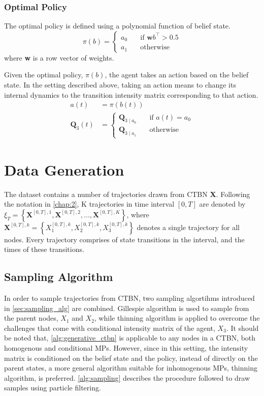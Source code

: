 \subsubsection{Optimal Policy}

The optimal policy is defined using a polynomial function of belief state.
\begin{equation}
\pi(b) = 
\begin{cases}
a_0 & \quad \text{if } \textbf{w}b^\intercal > 0.5 \\
a_1 & \quad \text{otherwise}
\end{cases}
\end{equation}
where \textbf{w} is a row vector of weights.

Given the optimal policy, $ \pi(b) $, the agent takes an action based on the belief state. In the setting described above, taking an action means to change its internal dynamics to the transition intensity matrix corresponding to that action.
\begin{align}
a(t) &= \pi(b(t))\\
\textbf{Q}_3(t) & = \begin{cases}
\textbf{Q}_{3\mid a_{0}} & \quad \text{if } a(t) = a_0 \\
\textbf{Q}_{3\mid a_{1}} & \quad \text{otherwise}
\end{cases}
\end{align}

\section{Data Generation}
The dataset contains a number of trajectories drawn from CTBN \textbf{X}. Following the notation in \cref{chap:2}, K trajectories in time interval $ [0, T] $ are denoted by $ \xi_T = \left\lbrace \textbf{X}^{[0,T], 1}, \textbf{X}^{[0,T], 2}, ..., \textbf{X}^{[0,T], K} \right\rbrace  $, where $ \textbf{X}^{[0,T],k} = \left\lbrace X_1^{[0,T],k} , X_2^{[0,T],k}, X_3^{[0,T],k}\right\rbrace $ denotes a single trajectory for all nodes. Every trajectory comprises of state transitions in the interval, and the times of these transitions. 

\subsection{Sampling Algorithm}
In order to sample trajectories from CTBN, two sampling algortihms introduced in \cref{sec:sampling_alg} are combined. Gillespie algorithm is used to sample from the parent nodes, $ X_1 $ and $ X_2 $, while thinning algorithm is applied to overcome the challenges that come with conditional intensity matrix of the agent, $ X_3 $. It should be noted that, \cref{alg:generative_ctbn} is applicable to any nodes in a CTBN, both homogenous and conditional MPs. However, since in this setting, the intensity matrix is conditioned on the belief state and the policy, instead of directly on the parent states, a more general algorithm suitable for inhomogenous MPs, thinning algorithm, is preferred. \cref{alg:sampling} describes the procedure followed to draw samples using particle filtering. 

